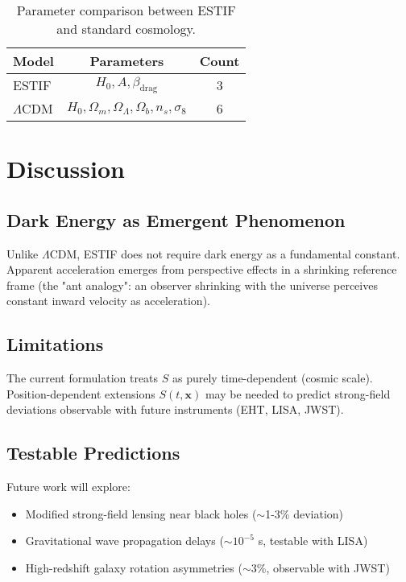 \documentclass[12pt,a4paper]{article}
\begin{document}
\begin{table}[h]
\centering
\begin{tabular}{|l|c|c|}
\hline
\textbf{Model} & \textbf{Parameters} & \textbf{Count} \\
\hline
ESTIF & $H_0, A, \beta_{\text{drag}}$ & 3 \\
$\Lambda$CDM & $H_0, \Omega_m, \Omega_\Lambda, \Omega_b, n_s, \sigma_8$ & 6 \\
\hline
\end{tabular}
\caption{Parameter comparison between ESTIF and standard cosmology.}
\label{tab:parameters}
\end{table}

\section{Discussion}

\subsection{Dark Energy as Emergent Phenomenon}

Unlike $\Lambda$CDM, ESTIF does not require dark energy as a fundamental constant. Apparent acceleration emerges from perspective effects in a shrinking reference frame (the "ant analogy": an observer shrinking with the universe perceives constant inward velocity as acceleration).

\subsection{Limitations}

The current formulation treats $S$ as purely time-dependent (cosmic scale). Position-dependent extensions $S(t,\mathbf{x})$ may be needed to predict strong-field deviations observable with future instruments (EHT, LISA, JWST).

\subsection{Testable Predictions}

Future work will explore:
\begin{itemize}
\item Modified strong-field lensing near black holes ($\sim$1-3\% deviation)
\item Gravitational wave propagation delays ($\sim 10^{-5}$ s, testable with LISA)
\item High-redshift galaxy rotation asymmetries ($\sim$3\%, observable with JWST)
\end{itemize}
\end{document}
